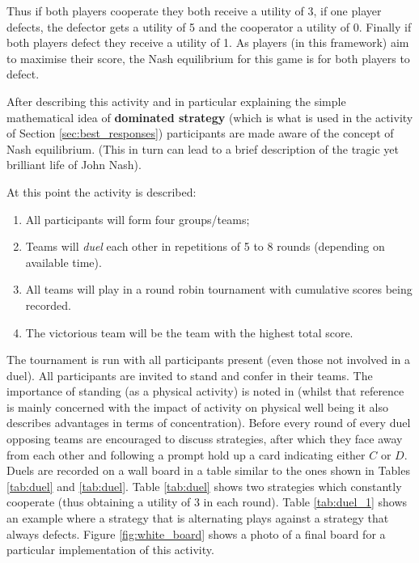 \documentclass{article}
\begin{document}
Thus if both players cooperate they both receive a utility of 3, if one player
defects, the defector gets a utility of 5 and the cooperator a utility of 0.
Finally if both players defect they receive a utility of 1. As players (in this
framework) aim to maximise their score, the Nash equilibrium for this game is
for both players to defect.

After describing this activity and in particular explaining the simple
mathematical idea of \textbf{dominated strategy} (which is what is used in the
activity of Section \ref{sec:best_responses}) participants are made aware of the
concept of Nash equilibrium. (This in turn can lead to a brief description of the
tragic yet brilliant life of John Nash).

At this point the activity is described:

\begin{enumerate}
    \item All participants will form four groups/teams;
    \item Teams will \textit{duel} each other in repetitions of 5 to 8 rounds
        (depending on available time).
    \item All teams will play in a round robin tournament with cumulative scores
        being recorded.
    \item The victorious team will be the team with the highest total score.
\end{enumerate}

The tournament is run with all participants present (even those not involved in
a duel).  All participants are invited to stand and confer in their teams. The
importance of standing (as a physical activity) is noted in \cite{Donnelly2011}
(whilst that reference is mainly concerned with the impact of activity on
physical well being it also describes advantages in terms of concentration).
Before every round of every duel opposing teams are encouraged to discuss
strategies, after which they face away from each other and following a prompt
hold up a card indicating either \(C\) or \(D\).  Duels are recorded on a wall
board in a table similar to the ones shown in Tables \ref{tab:duel} and
\ref{tab:duel}.  Table \ref{tab:duel} shows two strategies which constantly
cooperate (thus obtaining a utility of 3 in each round). Table \ref{tab:duel_1}
shows an example where a strategy that is alternating plays against a strategy
that always defects.  Figure \ref{fig:white_board} shows a photo of a final
board for a particular implementation of this activity.
\end{document}
